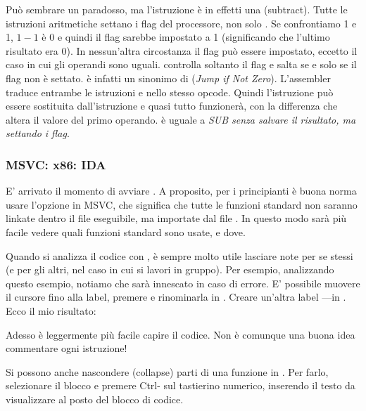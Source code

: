 \label{CMPandSUB}
Può sembrare un paradosso, ma l'istruzione \CMP è in effetti una \SUB (subtract).
Tutte le istruzioni aritmetiche settano i flag del processore, non solo \CMP.
Se confrontiamo 1 e 1, $1-1$ è 0 e quindi il flag \ZF sarebbe impostato a 1 (significando che l'ultimo risultato era 0).
In nessun'altra circostanza il flag \ZF può essere impostato, eccetto il caso in cui gli operandi sono uguali.
\JNE controlla soltanto il flag \ZF e salta se e solo se il flag non è settato.  \JNE è infatti un sinonimo di \JNZ (\emph{Jump if Not Zero}).
L'assembler traduce entrambe le istruzioni \JNE e \JNZ nello stesso opcode.
Quindi l'istruzione \CMP può essere sostituita dall'istruzione \SUB e quasi tutto funzionerà, con la differenza che \SUB altera il valore del primo operando.
\CMP è uguale a \emph{SUB senza salvare il risultato, ma settando i flag}.

\subsubsection{MSVC: x86: IDA}

E' arrivato il momento di avviare \IDA. A proposito, per i principianti è buona norma usare l'opzione  in MSVC, che significa che tutte le funzioni
standard non saranno linkate dentro il file eseguibile, ma importate dal file .
In questo modo sarà più facile vedere quali funzioni standard sono usate, e dove.

Quando si analizza il codice con \IDA, è sempre molto utile lasciare note per se stessi (e per gli altri, nel caso in cui si lavori in gruppo).
Per esempio, analizzando questo esempio, notiamo che 
 sarà innescato in caso di errore.
E' possibile muovere il cursore fino alla label, premere  e rinominarla in .
Creare un'altra label ---in .
Ecco il mio risultato:



Adesso è leggermente più facile capire il codice.
Non è comunque una buona idea commentare ogni istruzione!

Si possono anche nascondere (collapse) parti di una funzione in \IDA.
Per farlo, selezionare il blocco e premere Ctrl-\q{--} sul tastierino numerico, inserendo il testo da visualizzare al posto del blocco di codice.

